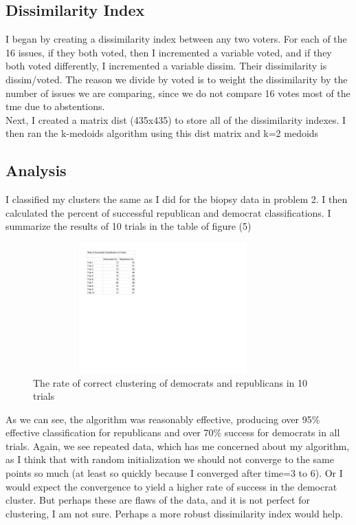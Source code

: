 \documentclass{article}
\begin{document}
\subsection*{Dissimilarity Index}
I began by creating a dissimilarity index between any two voters. For each of the 16 issues, if they both voted, then I incremented a variable voted, and if they both voted differently, I incremented a variable dissim.  Their dissimilarity is dissim/voted.  The reason we divide by voted is to weight the dissimilarity by the number of issues we are comparing, since we do not compare 16 votes most of the tme due to abstentions.\\
Next, I created a matrix dist (435x435) to store all of the dissimilarity indexes. I then ran the k-medoids algorithm using this dist matrix and k=2 medoids

\subsection*{Analysis}
I classified my clusters the same as I did for the biopsy data in problem 2.  I then calculated the percent of successful republican and democrat classifications.  I summarize the results of 10 trials in the table of figure (5)

\begin{figure}[h!]
    \centerline
    {
    \includegraphics[width=10cm, height=5cm] {voters_classification} 
    }
    \caption{\label{fig:my figure} The rate of correct clustering of democrats and republicans in 10 trials }
    \end{figure}
    
As we can see, the algorithm was reasonably effective, producing over 95\% effective classification for republicans and over 70\% success for democrats in all trials.  Again, we see repeated data, which has me concerned about my algorithm, as I think that with random initialization we should not converge to the same points so much (at least so quickly because I converged after time=3 to 6).  Or I would expect the convergence to yield a higher rate of success in the democrat cluster.  But perhaps these are flaws of the data, and it is not perfect for clustering, I am not sure.  Perhaps a more robust dissimilarity index would help. 
\end{document}
